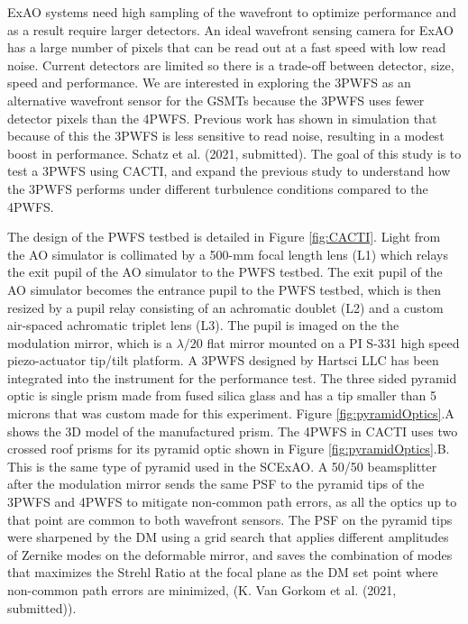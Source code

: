 ExAO systems need high sampling of the wavefront to optimize performance and as a result require larger detectors. An ideal wavefront sensing camera for ExAO has a large number of pixels that can be read out at a fast speed with low read noise. Current detectors are limited so there is a trade-off between detector, size, speed and performance. We are interested in exploring the 3PWFS as an alternative wavefront sensor for the GSMTs because the 3PWFS uses fewer detector pixels than the 4PWFS. Previous work has shown in simulation that because of this the 3PWFS is less sensitive to read noise, resulting in a modest boost in performance. Schatz et al. (2021, submitted). The goal of this study is to test a 3PWFS using CACTI, and expand the previous study to understand how the 3PWFS performs under different turbulence conditions compared to the 4PWFS. 

The design of the PWFS testbed is detailed in Figure \ref{fig:CACTI}. Light from the AO simulator is collimated by a 500-mm focal length lens (L1) which relays the exit pupil of the AO simulator to the PWFS testbed. The exit pupil of the AO simulator becomes the entrance pupil to the PWFS testbed, which is then resized by a pupil relay consisting of an achromatic doublet (L2) and a custom air-spaced achromatic triplet lens (L3). The pupil is imaged on the the modulation mirror, which is a $\lambda/20$ flat mirror mounted on a PI S-331 high speed piezo-actuator tip/tilt platform. A 3PWFS designed by Hartsci LLC has been integrated into the instrument for the performance test. The three sided pyramid optic is single prism made from fused silica glass and has a tip smaller than 5 microns that was custom made for this experiment. Figure \ref{fig:pyramidOptics}.A shows the 3D model of the manufactured prism. The 4PWFS in CACTI uses two crossed roof prisms for its pyramid optic shown in Figure \ref{fig:pyramidOptics}.B. This is the same type of pyramid used in the SCExAO\cite{jovanovic2015subaru}.  A 50/50 beamsplitter after the modulation mirror sends the same PSF to the pyramid tips of the 3PWFS and 4PWFS to mitigate non-common path errors, as all the optics up to that point are common to both wavefront sensors. The PSF on the pyramid tips were sharpened by the DM using a grid search that applies different amplitudes of Zernike modes on the deformable mirror, and saves the combination of modes that maximizes the Strehl Ratio at the focal plane as the  DM set point where non-common path errors are minimized, (K. Van Gorkom et al. (2021, submitted)).

